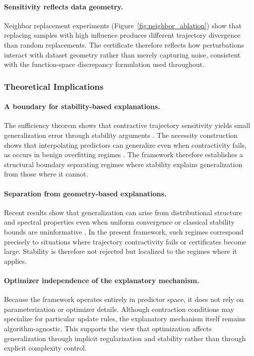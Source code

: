 \documentclass{article}
\numberwithin{equation}{section}
\begin{document}
\paragraph{Sensitivity reflects data geometry.}
Neighbor replacement experiments (Figure~\ref{fig:neighbor_ablation}) show that replacing samples with high influence produces different trajectory divergence than random replacements. The certificate therefore reflects how perturbations interact with dataset geometry rather than merely capturing noise, consistent with the function-space discrepancy formulation used throughout.

\subsubsection{Theoretical Implications}
\label{subsubsec:discussion_theoretical}

\paragraph{A boundary for stability-based explanations.}
The sufficiency theorem shows that contractive trajectory sensitivity yields small generalization error through stability arguments \cite{bousquet2002stability}. The necessity construction shows that interpolating predictors can generalize even when contractivity fails, as occurs in benign overfitting regimes \cite{BartlettLongLugosiTsigler2020}. The framework therefore establishes a structural boundary separating regimes where stability explains generalization from those where it cannot.

\paragraph{Separation from geometry-based explanations.}
Recent results show that generalization can arise from distributional structure and spectral properties even when uniform convergence or classical stability bounds are uninformative \cite{NagarajanKolter2019,LiangRakhlin2020}. In the present framework, such regimes correspond precisely to situations where trajectory contractivity fails or certificates become large. Stability is therefore not rejected but localized to the regimes where it applies.

\paragraph{Optimizer independence of the explanatory mechanism.}
Because the framework operates entirely in predictor space, it does not rely on parameterization or optimizer details. Although contraction conditions may specialize for particular update rules, the explanatory mechanism itself remains algorithm-agnostic. This supports the view that optimization affects generalization through implicit regularization and stability rather than through explicit complexity control.
\end{document}
